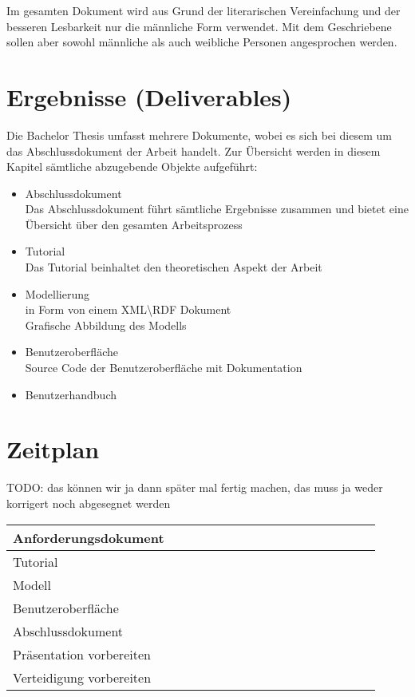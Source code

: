 Im gesamten Dokument wird aus Grund der literarischen Vereinfachung und der besseren Lesbarkeit nur die männliche Form verwendet. Mit dem Geschriebene sollen aber sowohl männliche als auch weibliche Personen angesprochen werden.

\section{Ergebnisse (Deliverables)}
\label{sec:admin_ergebniss}
Die Bachelor Thesis umfasst mehrere Dokumente, wobei es sich bei diesem um das Abschlussdokument der Arbeit handelt. Zur Übersicht werden in diesem Kapitel sämtliche abzugebende Objekte aufgeführt:
\begin{itemize}
	\item Abschlussdokument\\ Das Abschlussdokument führt sämtliche Ergebnisse zusammen und bietet eine Übersicht über den gesamten Arbeitsprozess
	\item Tutorial\\ Das Tutorial beinhaltet den theoretischen Aspekt der Arbeit
	\item Modellierung \\in Form von einem XML\textbackslash RDF Dokument\\ Grafische Abbildung des Modells
	\item Benutzeroberfläche\\ Source Code der Benutzeroberfläche mit Dokumentation
	\item Benutzerhandbuch 
\end{itemize}

\section{Zeitplan}
\label{sec:admin_zeitplan}
TODO: das können wir ja dann später mal fertig machen, das muss ja weder korrigert noch abgesegnet werden

\begin{center}
    \begin{tabular}{ | p{5cm} | l | l |l|l|l|l|l|l|l|l|l|l|l|l|l|l|} 
		\hline %
    Anforderungsdokument 	& \cellcolor{cyan} &  \cellcolor{cyan}&  \cellcolor{cyan}& & & & & & & & & & & & & \\  \hline  %
    Tutorial  & & & & & & & & & & & & & & & & \\  \hline 
    Modell  & & & & & & & & & & & & & & & & \\ \hline
    Benutzeroberfläche  & & & & & & & & & & & & & & & & \\  \hline
    Abschlussdokument  & & & & & & & & & & & & & & & & \\   \hline
    Präsentation vorbereiten  & & & & & & & & & & & & & & & &  \\  \hline
    Verteidigung vorbereiten  & & & & & & & & & & & & & & & &  \\  \hline		
    \end{tabular}
\end{center}

